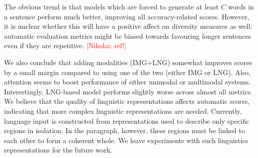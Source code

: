 \documentclass[11pt,a4paper]{article}
\newcommand{\kibitz}[2]{\ifnum\Comments=1\textcolor{#1}{#2}\fi}
\newcommand{\nikolai}[1]{\kibitz{red}      {[Nikolai: #1]}}
\begin{document}
The obvious trend is that models which are forced to generate at least $C$ words in a sentence perform much better, improving all accuracy-related scores.
However, it is unclear whether this will have a positive affect on diversity measures as well: automatic evaluation metrics might be biased towards favouring longer sentences even if they are repetitive.
\nikolai{ref!}

We also conclude that adding modalities (IMG+LNG) somewhat improves scores by a small margin compared to using one of the two (either IMG or LNG).
Also, attention seems to boost performance of either unimodal or multimodal systems.
Interestingly, LNG-based model performs slightly worse across almost all metrics.
We believe that the quality of linguistic representations affects automatic scores, indicating that more complex linguistic representations are needed.
Currently, language input is constructed from representations used to describe only specific regions in isolation.
In the paragraph, however, these regions must be linked to each other to form a coherent whole.
We leave experiments with such linguistics representations for the future work.

\end{document}
